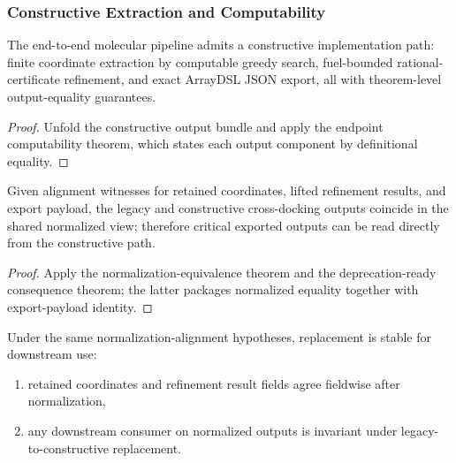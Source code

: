 \subsubsection{Constructive Extraction and Computability}

\begin{theorem}\label{thm:top-level-computable-path}
The end-to-end molecular pipeline admits a constructive implementation path: finite coordinate extraction by computable greedy search, fuel-bounded rational-certificate refinement, and exact ArrayDSL JSON export, all with theorem-level output-equality guarantees.
\end{theorem}

\begin{proof}
Unfold the constructive output bundle and apply the endpoint computability theorem, which states each output component by definitional equality.
\end{proof}

\begin{theorem}\label{thm:legacy-constructive-deprecation-bridge}
Given alignment witnesses for retained coordinates, lifted refinement results, and export payload, the legacy and constructive cross-docking outputs coincide in the shared normalized view; therefore critical exported outputs can be read directly from the constructive path.
\end{theorem}

\begin{proof}
Apply the normalization-equivalence theorem and the deprecation-ready consequence theorem; the latter packages normalized equality together with export-payload identity.
\end{proof}

\begin{theorem}\label{thm:constructive-downstream-replacement-transport}
Under the same normalization-alignment hypotheses, replacement is stable for downstream use:
\begin{enumerate}
\item retained coordinates and refinement result fields agree fieldwise after normalization,
\item any downstream consumer on normalized outputs is invariant under legacy-to-constructive replacement.
\end{enumerate}
\end{theorem}

